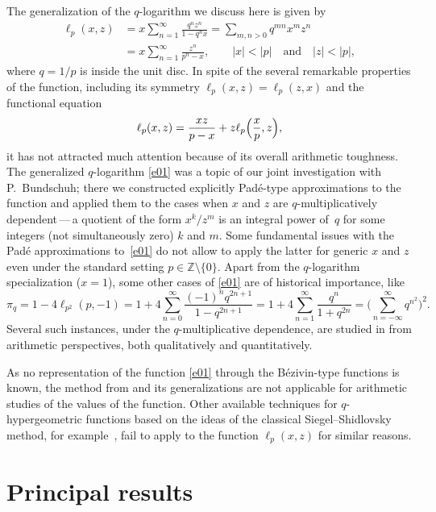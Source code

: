 \documentclass[12pt,reqno]{amsart}
\theoremstyle{remark}
\begin{document}
The generalization of the $q$-logarithm we discuss here is given by
\begin{align}
\ell_p(x,z)
&=x\sum_{n=1}^\infty\frac{q^nz^n}{1-q^nx}
=\sum_{m,n>0}q^{mn}x^mz^n
\nonumber\\
&=x\sum_{n=1}^\infty\frac{z^n}{p^n-x}, \qquad |x|<|p| \quad\text{and}\quad |z|<|p|,
\label{e01}
\end{align}
where $q=1/p$ is inside the unit disc. In spite of the several remarkable properties of the function, including its symmetry $\ell_p(x,z)=\ell_p(z,x)$ and
the functional equation
\begin{equation*}
\ell_p(x,z)=\frac{xz}{p-x}+z\ell_p\Bigl(\frac xp,z\Bigr),
\end{equation*}
it has not attracted much attention because of its overall arithmetic toughness. The generalized $q$-logarithm \eqref{e01} was a topic
of our joint investigation \cite{BZ08} with P.~Bundschuh; there we constructed explicitly Pad\'e-type approximations to the function
and applied them to the cases when $x$ and $z$ are $q$-multiplicatively dependent\,---\,a quotient of the form $x^k/z^m$ is an integral power of~$q$
for some integers (not simultaneously zero) $k$ and $m$. Some fundamental issues with the Pad\'e approximations to~\eqref{e01} do not allow to apply the latter
for generic $x$ and $z$ even under the standard setting $p\in\mathbb Z\setminus\{0\}$. Apart from the $q$-logarithm specialization ($x=1$),
some other cases of \eqref{e01} are of historical importance, like
$$
\pi_q=1-4\ell_{p^2}(p,-1)
=1+4\sum_{n=0}^\infty\frac{(-1)^nq^{2n+1}}{1-q^{2n+1}}
=1+4\sum_{n=1}^\infty\frac{q^n}{1+q^{2n}}
=\biggl(\sum_{n=-\infty}^\infty q^{n^2}\biggr)^2.
$$
Several such instances, under the $q$-multiplicative dependence, are studied in \cite{BZ07,BZ08} from arithmetic perspectives, both qualitatively and quantitatively.

As no representation of the function \eqref{e01} through the B\'ezivin-type functions is known, the method from \cite{Be88,Be90} and its generalizations
are not applicable for arithmetic studies of the values of the function. Other available techniques for $q$-hyper\-geo\-metric functions based on the ideas
of the classical Siegel--Shidlovsky method, for example~\cite{AKV01}, fail to apply to the function $\ell_p(x,z)$ for similar reasons.

\section{Principal results}
\label{s2}
\end{document}
